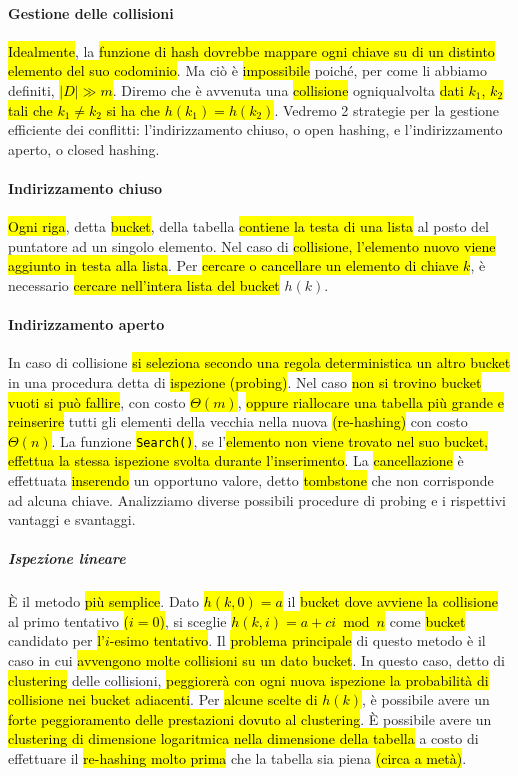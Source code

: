 \documentclass[a4paper,11pt,oneside]{article}
\theoremstyle{plain}
\theoremstyle{definition}
\theoremstyle{remark}
\begin{document}
\paragraph{Gestione delle collisioni} \hl{Idealmente}, la \hl{funzione di hash
dovrebbe mappare ogni chiave su di un distinto elemento del suo codominio}. Ma
ciò è \hl{impossibile} poiché, per come li abbiamo definiti, \hl{$|D| \gg m$}.
Diremo che è avvenuta una \hl{collisione} ogniqualvolta \hl{dati $k_1$, $k_2$
tali che $k_1 \neq k_2$ si ha che $h(k_1) = h(k_2)$}. Vedremo 2 strategie per la
gestione efficiente dei conflitti: l'indirizzamento chiuso, o open hashing, e
l'indirizzamento aperto, o closed hashing.

\paragraph{Indirizzamento chiuso} \hl{Ogni riga}, detta \hl{bucket}, della
tabella \hl{contiene la testa di una lista} al posto del puntatore ad un singolo
elemento. Nel caso di \hl{collisione, l'elemento nuovo viene aggiunto in testa
alla lista}. Per \hl{cercare o cancellare un elemento di chiave $k$}, è
necessario \hl{cercare nell'intera lista del bucket} $h(k)$.

\paragraph{Indirizzamento aperto} In caso di collisione \hl{si seleziona secondo
una regola deterministica un altro bucket} in una procedura detta di
\hl{ispezione (probing)}. Nel caso \hl{non si trovino bucket vuoti si può
fallire}, con costo \hl{$\Theta(m)$}, \hl{oppure riallocare una tabella più
grande e reinserire} tutti gli elementi della vecchia nella nuova
\hl{(re-hashing)} con costo \hl{$\Theta(n)$}. La funzione
\hl{\texttt{Search()}}, se l'\hl{elemento non viene trovato nel suo bucket,
effettua la stessa ispezione svolta durante l'inserimento}. La
\hl{cancellazione} è effettuata \hl{inserendo} un opportuno valore, detto
\hl{tombstone} che non corrisponde ad alcuna chiave. Analizziamo diverse
possibili procedure di probing e i rispettivi vantaggi e svantaggi.

\subparagraph{Ispezione lineare} È il metodo \hl{più semplice}. Dato \hl{$h(k,
0) = a$} il \hl{bucket dove avviene la collisione} al primo tentativo \hl{($i =
0$)}, si sceglie \hl{$h(k,i) = a + ci \bmod n$} come \hl{bucket} candidato per
\hl{l'$i$-esimo tentativo}. Il \hl{problema principale} di questo metodo è il
caso in cui \hl{avvengono molte collisioni su un dato bucket}. In questo caso,
detto di \hl{clustering} delle collisioni, \hl{peggiorerà con ogni nuova
ispezione la probabilità di collisione nei bucket adiacenti}. Per \hl{alcune
scelte di $h(k)$}, è possibile avere un \hl{forte peggioramento delle
prestazioni dovuto al clustering}. È possibile avere un \hl{clustering di
dimensione logaritmica nella dimensione della tabella} a costo di effettuare il
\hl{re-hashing molto prima} che la tabella sia piena \hl{(circa a metà)}.
\end{document}
